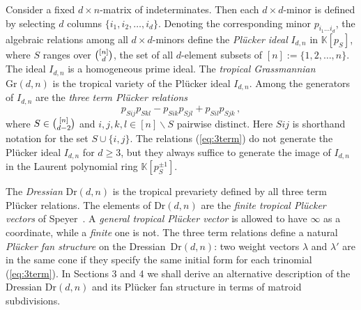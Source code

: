 \documentclass[12pt,a4paper]{amsart}
\theoremstyle{definition}
\newcommand{\K}{{\mathbb{K}}}
\newcommand{\Gr}{{\mathrm{Gr}}}
\newcommand{\Dr}{{\mathrm{Dr}}}
\begin{document}
Consider a fixed $d\times n$-matrix of indeterminates. Then each
$d\times d$-minor is defined by selecting $d$ columns
$\{i_1,i_2,\dots,i_d\}$.  Denoting the corresponding minor
$p_{i_1\ldots i_d}$, the algebraic relations among all $ d\times
d$-minors define the \emph{Pl\"ucker ideal} $I_{d,n}$ in $\K[p_S]$,
where $S$ ranges over $\tbinom{[n]}{d}$, the set of all $d$-element
subsets of $[n]:=\{1,2,\dots,n\}$.  The ideal $I_{d,n}$ is a
homogeneous prime ideal.  The \emph{tropical Grassmannian} $\Gr(d,n)$
is the tropical variety of the Pl\"ucker ideal $I_{d,n}$.  Among the
generators of $I_{d,n}$ are the \emph{three term Pl\"ucker relations}
\begin{equation}\label{eq:3term}
  p_{Sij}p_{Skl} - p_{Sik}p_{Sjl} + p_{Sil}p_{Sjk} \, ,
\end{equation}
where $S\in\tbinom{[n]}{d-2}$ and $i,j,k,l\in [n]\backslash S$
pairwise distinct.  Here $Sij$ is shorthand notation for the set
$S\cup\{i,j\}$.  The relations (\ref{eq:3term}) do not generate the
Pl\"ucker ideal $I_{d,n}$ for $d \geq 3$, but they always suffice to
generate the image of $I_{d,n}$ in the Laurent polynomial ring
$\K[p_S^{\pm 1}]$.

The \emph{Dressian} $\Dr(d,n)$ is the tropical prevariety defined by
all three term Pl\"ucker relations.  The elements of $\Dr(d,n)$ are
the \emph{finite tropical Pl\"ucker vectors} of Speyer~\cite{Spe1}.  A
\emph{general tropical Pl\"ucker vector} is allowed to have $\infty$
as a coordinate, while a \emph{finite} one is not.  The three term
relations define a natural \emph{Pl\"ucker fan structure} on the
Dressian~$\Dr(d,n)$: two weight vectors $\lambda$ and $\lambda'$ are
in the same cone if they specify the same initial form for each
trinomial (\ref{eq:3term}).  In Sections 3 and 4 we shall derive an
alternative description of the Dressian $\Dr(d,n)$ and its Pl\"ucker
fan structure in terms of matroid subdivisions.
\end{document}
